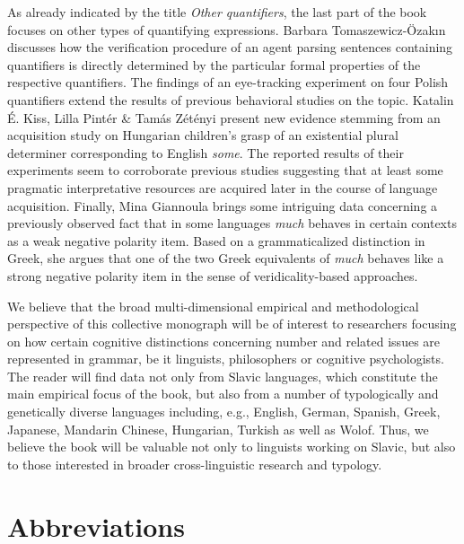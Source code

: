 \documentclass[output=paper]{langscibook}
\begin{document}
As already indicated by the title \textit{Other quantifiers}, the last part of the book focuses on other types of quantifying expressions. Barbara Tomaszewicz-Özakın discusses how the verification procedure of an agent parsing sentences containing quantifiers is directly determined by the particular formal properties of the respective quantifiers. The findings of an eye-tracking experiment on four Polish quantifiers extend the results of previous behavioral studies on the topic. Katalin É. Kiss, Lilla Pintér \& Tamás Zétényi present new evidence stemming from an acquisition study on Hungarian children's grasp of an existential plural determiner corresponding to English \textit{some}. The reported results of their experiments seem to corroborate previous studies suggesting that at least some pragmatic interpretative resources are acquired later in the course of language acquisition. Finally, Mina Giannoula brings some intriguing data concerning a previously observed fact that in some languages \textit{much} behaves in certain contexts as a weak negative polarity item. Based on a grammaticalized distinction in Greek, she argues that one of the two Greek equivalents of \textit{much} behaves like a strong negative polarity item in the sense of veridicality-based approaches.

We believe that the broad multi-dimensional empirical and methodological perspective of this collective monograph will be of interest to researchers focusing on how certain cognitive distinctions concerning number and related issues are represented in grammar, be it linguists, philosophers or cognitive psychologists. The reader will find data not only from Slavic languages, which constitute the main empirical focus of the book, but also from a number of typologically and genetically diverse languages including, e.g., English, German, Spanish, Greek, Japanese, Mandarin Chinese, Hungarian, Turkish as well as Wolof. Thus, we believe the book will be valuable not only to linguists working on Slavic, but also to those interested in broader cross-linguistic research and typology. 

\section*{Abbreviations}
\end{document}

